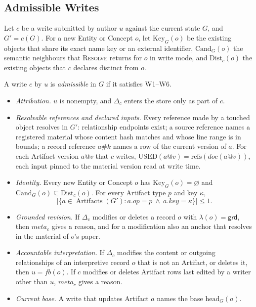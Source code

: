 \documentclass[sigconf,review,anonymous]{acmart}
\begin{document}
\subsection{Admissible Writes}
\label{sec:admissible-draft}

Let $c$ be a write submitted by author $u$ against the current state $G$, and
$G'=c(G)$. For a new Entity or Concept $o$, let $\mathrm{Key}_G(o)$ be the
existing objects that share its exact name key or an external identifier,
$\mathrm{Cand}_G(o)$ the semantic neighbours that \textsc{Resolve} returns for
$o$ in write mode, and $\mathrm{Dist}_c(o)$ the existing objects that $c$
declares distinct from $o$.

\begin{definition}
\label{def:admissible}
A write $c$ by $u$ is \emph{admissible} in $G$ if it satisfies W1--W6.
\begin{itemize}
  \item[\textbf{W1}] \emph{Attribution.} $u$ is nonempty, and $\Delta_c$
    enters the store only as part of $c$.
  \item[\textbf{W2}] \emph{Resolvable references and declared inputs.} Every
    reference made by a touched object resolves in $G'$: relationship
    endpoints exist; a source reference names a registered material whose
    content hash matches and whose line range is in bounds; a record
    reference $a\#k$ names a row of the current version of $a$. For each
    Artifact version $a@v$ that $c$ writes,
    $\mathrm{USED}(a@v)=\mathrm{refs}(\mathit{doc}(a@v))$, each input pinned to
    the material version read at write time.
  \item[\textbf{W3}] \emph{Identity.} Every new Entity or Concept $o$ has
    $\mathrm{Key}_G(o)=\varnothing$ and
    $\mathrm{Cand}_G(o)\subseteq\mathrm{Dist}_c(o)$. For every Artifact type
    $p$ and key $\kappa$,
    \begin{equation}
    \label{eq:artifact-key}
    \left|\{a\in\operatorname{Artifacts}(G'):
      a.\mathit{op}=p\ \land\ a.\mathit{key}=\kappa\}\right|\leq 1.
    \end{equation}
  \item[\textbf{W4}] \emph{Grounded revision.} If $\Delta_c$ modifies or
    deletes a record $o$ with $\lambda(o)=\mathsf{grd}$, then
    $\mathit{meta}_c$ gives a reason, and for a modification also an anchor
    that resolves in the material of $o$'s paper.
  \item[\textbf{W5}] \emph{Accountable interpretation.} If $\Delta_c$ modifies
    the content or outgoing relationships of an interpretive record $o$ that
    is not an Artifact, or deletes it, then $u=\mathit{fb}(o)$. If $c$
    modifies or deletes Artifact rows last edited by a writer other than $u$,
    $\mathit{meta}_c$ gives a reason.
  \item[\textbf{W6}] \emph{Current base.} A write that updates Artifact $a$
    names the base $\mathrm{head}_G(a)$.
\end{itemize}
\end{definition}
\end{document}
